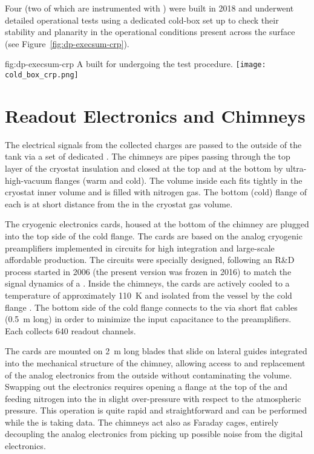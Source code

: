 Four  (two of which are instrumented with ) were built in 2018 and underwent detailed operational tests using a dedicated cold-box set up to check their  stability and planarity in the operational conditions present across the  surface (see Figure~\ref{fig:dp-execsum-crp}). 

\begin{dunefigure}{fig:dp-execsum-crp}
  {A   built for  undergoing the \coldbox test procedure.}
  \texttt{[image: cold\_box\_crp.png]}
\end{dunefigure}


\section{Readout Electronics and Chimneys}
\label{sec:dp-execsum-electronics}

The electrical signals from the collected charges are passed to the outside of the tank via a set of dedicated . The chimneys are pipes passing through the top layer of the cryostat insulation and closed at the top and at the bottom by ultra-high-vacuum flanges (warm and cold). The volume inside each  fits tightly in the cryostat inner volume and is filled with nitrogen gas. The bottom (cold) flange of each  is at short distance  from the  in the cryostat gas volume.

The cryogenic  electronics cards, housed at the bottom of the chimney are plugged into the top side of  the cold flange. The  cards are based on the analog cryogenic preamplifiers implemented in   circuits for high integration and large-scale affordable production. 
The  circuits were specially designed, following an R\&D process started in 2006 (the present version was frozen in 2016) to match the signal dynamics of a . Inside the chimneys, the cards are actively cooled to a temperature of approximately \SI{110}{K} and isolated from the  vessel by the cold flange \fdth{}.  The bottom side of the cold flange connects to the  via short flat cables (\SI{0.5}{m} long) in order to minimize the input capacitance to the preamplifiers. Each  collects \num{640} readout channels. 

The  cards are mounted on \SI{2}{m} long blades that slide on lateral guides integrated into the mechanical structure of the chimney, allowing access to and replacement of the analog  electronics from the outside without contaminating the  volume. 
Swapping out the  electronics requires opening a flange at the top of the  and feeding nitrogen into the  in slight over-pressure with respect to the atmospheric pressure.  This operation is quite rapid and straightforward and can be performed while the  is taking data. The chimneys act also as Faraday cages, entirely decoupling the analog  electronics  from picking up possible noise from the digital electronics.   

